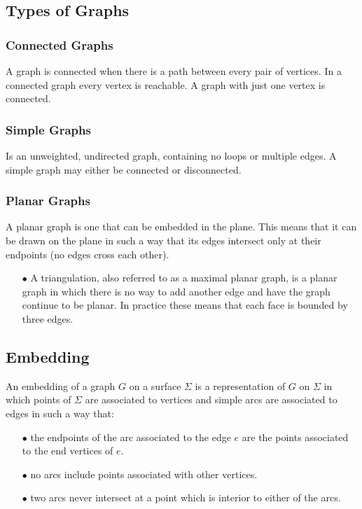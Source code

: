 \documentclass{article}
\begin{document}
\subsection{Types of Graphs}
\subsubsection{Connected Graphs}
A graph is connected when there is a path between every pair of vertices. In a connected graph every vertex is reachable. A graph with just one vertex is connected. \citep{mathworld:ConnectedGraphs}
\subsubsection{Simple Graphs}
Is an unweighted, undirected graph, containing no loops or multiple edges. A simple graph may either be connected or disconnected. \citep{mathworld:SimpleGraphs}
\subsubsection{Planar Graphs}
A planar graph is one that can be embedded in the plane. This means that it can be drawn on the plane in such a way that its edges intersect only at their endpoints (no edges cross each other). \citep{mathworld:PlanarGraph}
\begin{itemize}
\item[$\bullet$] A triangulation, also referred to as a maximal planar graph, is a planar graph in which there is no way to add another edge and have the graph continue to be planar. In practice these means that each face is bounded by three edges. \citep{mathworld:Triangulation}
\end{itemize}
\subsection{Embedding}
An embedding of a graph $G$ on a surface $\Sigma$ is a representation of $G$ on $\Sigma$ in which points of $\Sigma$ are associated to vertices and simple arcs are associated to edges in such a way that:
\begin{itemize}
\item[$\bullet$] the endpoints of the arc associated to the edge $e$ are the points associated to the end vertices of $e$.
\item[$\bullet$] no arcs include points associated with other vertices.
\item[$\bullet$] two arcs never intersect at a point which is interior to either of the arcs.
\end{itemize}
\end{document}
